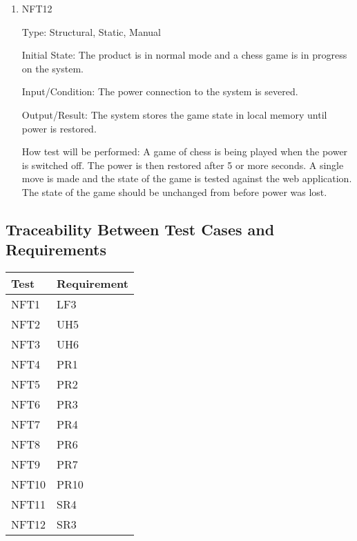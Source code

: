 \documentclass[12pt, titlepage]{article}
\begin{document}
\begin{enumerate}
    \item{NFT12}

        Type: Structural, Static, Manual
                            
        Initial State: The product is in normal mode and a chess game is in progress on the system.
                            
        Input/Condition: The power connection to the system is severed.
                            
        Output/Result: The system stores the game state in local memory until power is restored.
                            
        How test will be performed: A game of chess is being played when the power is switched off. The power is then restored after 5 or more seconds. A single
            move is made and the state of the game is tested against the web application. The state of the game should be unchanged from before power was lost.
\end{enumerate}

\subsection{Traceability Between Test Cases and Requirements}

\begin{table}[H]
    \centering
        \setlength{\leftmargini}{0.4cm}
        \begin{tabularx}{\linewidth}{|X|X|}
        \hline
        Test & Requirement\\
        \hline
        NFT1 & LF3\\
        \hline
        NFT2 & UH5\\
        \hline
        NFT3 & UH6\\
        \hline
        NFT4 & PR1\\
        \hline
        NFT5 & PR2\\
        \hline
        NFT6 & PR3\\
        \hline
        NFT7 & PR4\\
        \hline
        NFT8 & PR6\\
        \hline
        NFT9 & PR7\\
        \hline
        NFT10 & PR10\\
        \hline
        NFT11 & SR4\\
        \hline
        NFT12 & SR3\\
        \hline
        \end{tabularx}
    \label{Table}
\end{table}
\end{document}
